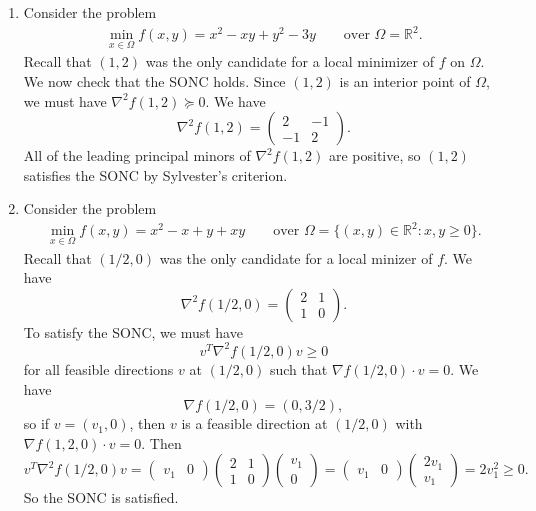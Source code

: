 \documentclass[11pt]{book}
\newcommand{\R}{\mathbb{R}}
\begin{document}
\begin{enumerate}
\item 
Consider the problem
\begin{align*}
\min_{x \in \Omega} f(x,y) = x^2 - xy + y^2 - 3y \qquad \text{over } \Omega = \R^2.
\end{align*}
Recall that $(1,2)$ was the only candidate for a local minimizer of $f$ on $\Omega$. We now check that the SONC holds. Since $(1,2)$ is an interior point of $\Omega$, we must have $\nabla^2 f(1,2) \succeq 0$. We have
\[
\nabla^2 f(1,2) = \begin{pmatrix}
2 & -1 \\ -1 & 2
\end{pmatrix}.
\]
All of the leading principal minors of $\nabla^2 f(1,2)$ are positive, so $(1,2)$ satisfies the SONC by Sylvester's criterion. 

\item 
Consider the problem
\begin{align*}
\min_{x \in \Omega} f(x,y) = x^2 - x + y + xy \qquad \text{over } \Omega = \{(x,y) \in \R^2 : x,y \geq 0\}.
\end{align*}
Recall that $(1/2, 0)$ was the only candidate for a local minizer of $f$. We have
\[
\nabla^2 f(1/2, 0) = \begin{pmatrix}
2 & 1 \\
1 & 0
\end{pmatrix}.
\]
To satisfy the SONC, we must have 
\[
v^T \nabla^2 f(1/2, 0) v \geq 0
\] 
for all feasible directions $v$ at $(1/2, 0)$ such that $\nabla f(1/2, 0) \cdot v = 0$. We have
\[
\nabla f(1/2, 0) = (0, 3/2),
\]
so if $v = (v_1, 0)$, then $v$ is a feasible direction at $(1/2, 0)$ with $\nabla f(1,2, 0) \cdot v = 0$. Then
\[
v^T \nabla^2 f(1/2, 0) v = \begin{pmatrix}
v_1 & 0
\end{pmatrix}\begin{pmatrix}
2 & 1 \\
1 & 0
\end{pmatrix}\begin{pmatrix}
v_1 \\ 0
\end{pmatrix} = \begin{pmatrix}
v_1 & 0
\end{pmatrix} \begin{pmatrix}
2v_1 \\ v_1
\end{pmatrix} = 2v_1^2 \geq 0.
\]
So the SONC is satisfied.
\end{enumerate}
\end{document}
